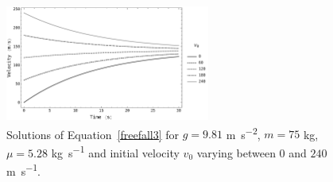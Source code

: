 \begin{figure}[h!]
	\begin{center}
			\includegraphics[width=0.6\textwidth]{FreeFall_1}
	\caption{Solutions of  Equation~\eqref{freefall3} for $g=9.81$ \si{m.s^{-2}}, $m=75$ \si{kg}, $\mu=5.28$ \si{kg.s^{-1}}  and initial velocity $v_0$ varying between $0$ and $240$ \si{m.s^{-1}}.}
	\label{FreeFall_1}
	\end{center}
\end{figure}

